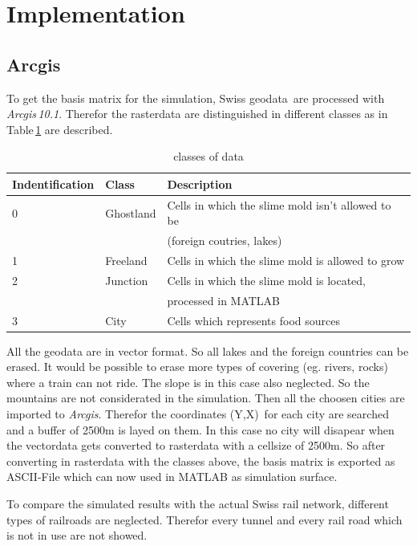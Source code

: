 \documentclass[11pt]{scrartcl}
\begin{document}
\section{Implementation}
\subsection{Arcgis}
\label{sec:arcgis}

To get the basis matrix for the simulation, Swiss geodata\,\cite{gis_data} are processed with \textit{Arcgis\,10.1}. Therefor the rasterdata are distinguished in different classes as in Table\,\ref{tab:class} are described.

\begin{table}[H]
	\centering
	\caption{classes of data}
		\begin{tabular}{lll}
		\toprule
		Indentification & Class & Description \\
		\midrule
		0 & Ghostland & Cells in which the slime mold isn't allowed to be\\
		& 		& (foreign coutries, lakes)\\
		1 & Freeland & Cells in which the slime mold is allowed to grow\\
		2 & Junction & Cells in which the slime mold is located, \\
		& & processed in MATLAB\\
		3 & City & Cells which represents food sources\\
		\bottomrule
	\end{tabular}
\label{tab:class}
\end{table}

All the geodata are in vector format. So all lakes and the foreign countries can be erased. It would be possible to erase more types of covering (eg. rivers, rocks) where a train can not ride. The slope is in this case also neglected. So the mountains are not considerated in the simulation. Then all the choosen cities are imported to \textit{Arcgis}. Therefor the coordinates (Y,X)\,\cite{coordinates} for each city are searched and a buffer of 2500m is layed on them. In this case no city will disapear when the vectordata gets converted to rasterdata with a cellsize of 2500m. So after converting in rasterdata with the classes above, the basis matrix is exported as ASCII-File which can now used in MATLAB as simulation surface.

To compare the simulated results with the actual Swiss rail network, different types of railroads are neglected. Therefor every tunnel and every rail road which is not in use are not showed.
\end{document}
